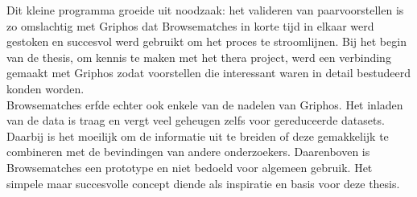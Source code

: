 Dit kleine programma groeide uit noodzaak: het valideren van paarvoorstellen is zo omslachtig met Griphos dat Browsematches in korte tijd in elkaar werd gestoken en succesvol werd gebruikt om het proces te stroomlijnen. Bij het begin van de thesis, om kennis te maken met het thera project, werd een verbinding gemaakt met Griphos zodat voorstellen die interessant waren in detail bestudeerd konden worden.\\

Browsematches erfde echter ook enkele van de nadelen van Griphos. Het inladen van de data is traag en vergt veel geheugen zelfs voor gereduceerde datasets. Daarbij is het moeilijk om de informatie uit te breiden of deze gemakkelijk te combineren met de bevindingen van andere onderzoekers. Daarenboven is Browsematches een prototype en niet bedoeld voor algemeen gebruik. Het simpele maar succesvolle concept diende als inspiratie en basis voor deze thesis. 

